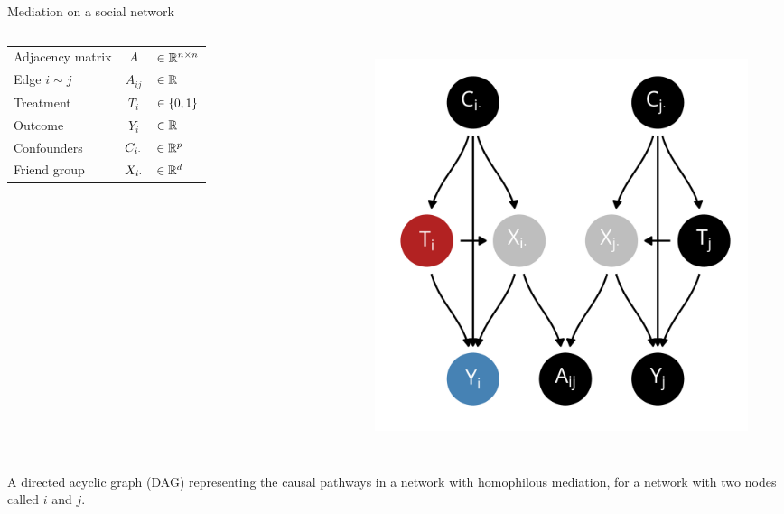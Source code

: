\documentclass{beamer}
\theoremstyle{remark}
\begin{document}
\begin{frame}{Mediation on a social network}

    \begin{columns}


        \begin{table}[]
            \begin{tabular}{lcl}
                Adjacency matrix & $A$            & $\in \mathbb{R}^{n \times n}$ \\
                Edge $i \sim j$  & $A_{ij}$       & $\in \mathbb{R}$              \\
                Treatment        & $T_i$          & $\in \{0, 1\} $     \\
                Outcome          & $Y_i$          & $\in \mathbb{R}$              \\
                Confounders      & $C_{i \cdot}$ & $\in \mathbb{R}^p$            \\
                Friend group     & $X_{i \cdot}$ & $\in \mathbb{R}^d$
            \end{tabular}
        \end{table}


        \begin{figure}[ht]
            \centering
            \includegraphics[width=\textwidth]{figures/dags/homophily-mediating.png}
            \label{fig:mediating}
        \end{figure}
    \end{columns}

    A directed acyclic graph (DAG) representing the causal pathways in a network with homophilous mediation, for a network with two nodes called $i$ and $j$.

\end{frame}
\end{document}
